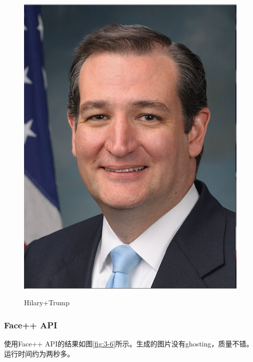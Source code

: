 \documentclass[a4paper]{article}
\begin{document}
\begin{figure}[htp]
{\begin{minipage}[b]{0.31\columnwidth}
{\includegraphics[width=1\columnwidth]{face_morphing/cruz.png}
}
\label{fig:3-5:c}
\end{minipage}
}
\caption{Hilary+Trump}
\label{fig:3-5}
\end{figure}

\subsubsection{Face++ API}
使用Face++ API的结果如图\ref{fig:3-6}所示。生成的图片没有ghosting，质量不错。运行时间约为两秒多。
\end{document}
